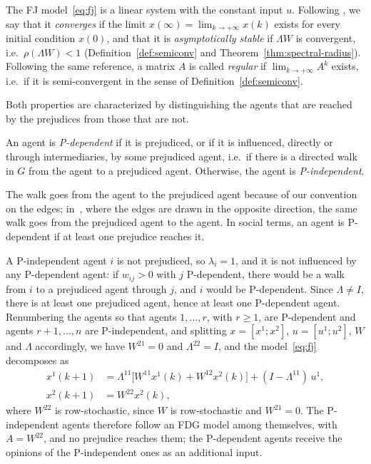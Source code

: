 The FJ model~\eqref{eq:fj} is a linear system with the constant input $u$. Following
\cite{proskurnikov2017tutorial}, we say that it \emph{converges} if the limit
$x(\infty) = \lim_{k \to +\infty} x(k)$ exists for every initial condition $x(0)$, and
that it is \emph{asymptotically stable} if $\Lambda W$ is convergent, i.e.\
$\rho(\Lambda W) < 1$ (Definition~\ref{def:semiconv} and
Theorem~\ref{thm:spectral-radius}). Following the same reference, a matrix $A$ is
called \emph{regular} if $\lim_{k \to +\infty} A^k$ exists, i.e.\ if it is
semi-convergent in the sense of Definition~\ref{def:semiconv}.

Both properties are characterized by distinguishing the agents that are reached by the
prejudices from those that are not.

\begin{definition}[P-dependent agents~\cite{proskurnikov2017tutorial}]
\label{def:p-dependent}
An agent is \emph{P-dependent} if it is prejudiced, or if it is influenced, directly or
through intermediaries, by some prejudiced agent, i.e.\ if there is a directed walk in
$G$ from the agent to a prejudiced agent. Otherwise, the agent is
\emph{P-independent}.
\end{definition}

The walk goes from the agent to the prejudiced agent because of our convention on the
edges; in~\cite{proskurnikov2017tutorial}, where the edges are drawn in the opposite
direction, the same walk goes from the prejudiced agent to the agent. In social terms,
an agent is P-dependent if at least one prejudice reaches it.

A P-independent agent $i$ is not prejudiced, so $\lambda_i = 1$, and it is not
influenced by any P-dependent agent: if $w_{ij} > 0$ with $j$ P-dependent, there would
be a walk from $i$ to a prejudiced agent through $j$, and $i$ would be P-dependent.
Since $\Lambda \neq I$, there is at least one prejudiced agent, hence at least one
P-dependent agent. Renumbering the agents so that agents $1, \dots, r$, with
$r \geq 1$, are P-dependent and agents $r+1, \dots, n$ are P-independent, and
splitting $x = [x^1; x^2]$, $u = [u^1; u^2]$, $W$ and $\Lambda$ accordingly, we
have $W^{21} = 0$ and $\Lambda^{22} = I$, and the model~\eqref{eq:fj} decomposes
as~\cite{proskurnikov2017tutorial}
\begin{align}
  x^1(k+1) &= \Lambda^{11}\bigl[W^{11} x^1(k) + W^{12} x^2(k)\bigr]
              + (I - \Lambda^{11})\, u^1, \label{eq:fj-dep}\\
  x^2(k+1) &= W^{22} x^2(k), \label{eq:fj-indep}
\end{align}
where $W^{22}$ is row-stochastic, since $W$ is row-stochastic and $W^{21} = 0$. The
P-independent agents therefore follow an FDG
model among themselves, with $A = W^{22}$, and no prejudice reaches them; the
P-dependent agents receive the opinions of the P-independent ones as an additional
input.

